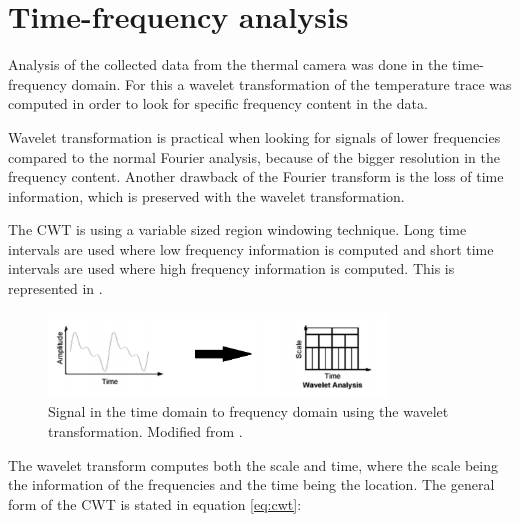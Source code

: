 \section{Time-frequency analysis}

Analysis of the collected data from the thermal camera was done in the time-frequency domain. For this a wavelet transformation of the temperature trace was computed in order to look for specific frequency content in the data. 

Wavelet transformation is practical when looking for signals of lower frequencies compared to the normal Fourier analysis, because of the bigger resolution in the frequency content. Another drawback of the Fourier transform is the loss of time information, which is preserved with the wavelet transformation. \cite{geyer2004}


The CWT is using a variable sized region windowing technique. Long time intervals are used where low frequency information is computed and short time intervals are used where high frequency information is computed. This is represented in .

\begin{figure}[H]
	\centering	\includegraphics[width=0.8\textwidth]{figures/signalToWavelet}
	\caption{Signal in the time domain to frequency domain using the wavelet transformation. Modified from \cite{Uvo1995}.}
	\label{fig:sigToWave}
\end{figure} \vspace{-.3cm}

The wavelet transform computes both the scale and time, where the scale being the information of the frequencies and the time being the location. The general form of the CWT is stated in equation \ref{eq:cwt}: 

